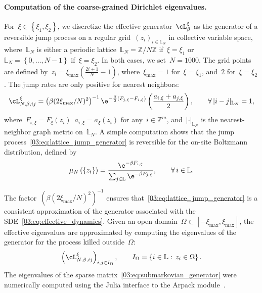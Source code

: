 \paragraph{Computation of the coarse-grained Dirichlet eigenvalues.}
For~$\xi\in\left\{\xi_1,\xi_2\right\}$, we discretize the effective generator~$\cL_{\beta}^\xi$ as the generator of a reversible jump process on a regular grid~$(z_i)_{i\in \mathbb L_N}$ in collective variable space, where~$\mathbb L_N$ is either a periodic lattice~$\mathbb{L}_N=\mathbb Z/N\mathbb Z$ if~$\xi=\xi_1$ or~$\mathbb{L}_N=\left\{0,\dots,N-1\right\}$ if~$\xi=\xi_2$.
In both cases, we set~$N=1000$.
The grid points are defined by~$z_i=\xi_{\max}\left(\frac{2i+1}{N}-1\right)$, where~$\xi_{\max}=1$ for~$\xi=\xi_1$, and~$2$ for~$\xi=\xi_2$.
The jump rates are only positive for nearest neighbors:
\begin{equation}
    \label{03:eq:lattice_jump_generator}
    \cL_{N,\beta,ij}^\xi = \left(\beta(2\xi_{\max}/N)^2\right)^{-1}\e^{-\frac{\beta}2\left(F_{j,\xi}-F_{i,\xi}\right)}\left(\frac{a_{i,\xi}+a_{j,\xi}}{2}\right),\qquad \forall\,|i-j|_{\mathbb{L}_N}=1,
\end{equation}
where~$F_{i,\xi} = F_\xi(z_i)$~$a_{i,\xi}=a_\xi(z_i)$ for any~$i\in \mathbb Z^m$, and~$|\cdot|_{\mathbb L_N}$ is the nearest-neighbor graph metric on~$\mathbb L_N$.
A simple computation shows that the jump process~\eqref{03:eq:lattice_jump_generator} is reversible for the on-site Boltzmann distribution, defined by
\begin{equation}\mu_{N}\left(\{z_i\}\right) =\frac{\e^{-\beta F_{i,\xi}}}{\sum_{j\in\mathbb L}\e^{-\beta F_{j,\xi}}},\qquad \forall\,i\in\mathbb L.\end{equation}

The factor~$\left(\beta(2\xi_{\max}/N)^2\right)^{-1}$ ensures that~\eqref{03:eq:lattice_jump_generator} is a consistent approximation of the generator associated with the SDE~\eqref{03:eq:effective_dynamics}.
Given an open domain~$\Omega\subset[-\xi_{\max},\xi_{\max}]$, the effective eigenvalues are approximated by computing the eigenvalues of the generator for the process killed outside~$\Omega$:
\begin{equation}
    \label{03:eq:submarkovian_generator}
    \left(\cL_{N,\beta,ij}^\xi\right)_{i,j\in I_{\Omega}},\qquad I_{\Omega}=\left\{i\in\mathbb L:\,z_i\in\Omega\right\}.
\end{equation}
The eigenvalues of the sparse matrix~\eqref{03:eq:submarkovian_generator} were numerically computed using the Julia interface to the Arpack module~\cite{LSY98}.
